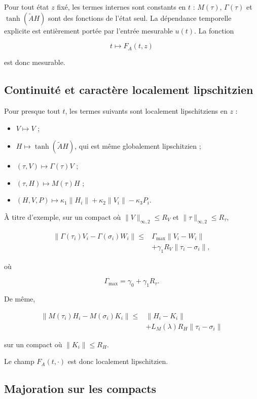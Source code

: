 Pour tout état \(z\) fixé, les termes internes sont constants en
\(t\) : \(M(\tau)\), \(\Gamma(\tau)\) et
\(\tanh(\widetilde A H)\) sont des fonctions de l'état seul. La
dépendance temporelle explicite est entièrement portée par l'entrée
mesurable \(u(t)\). La fonction

\[
t\longmapsto F_A(t,z)
\]

est donc mesurable.

\subsection{Continuité et caractère localement lipschitzien}
\label{annexe-existence-lipschitz}

Pour presque tout \(t\), les termes suivants sont localement
lipschitziens en \(z\) :

\begin{itemize}
\item
  \(V\mapsto V\) ;
\item
  \(H\mapsto\tanh(\widetilde A H)\), qui est même globalement
  lipschitzien ;
\item
  \((\tau,V)\mapsto\Gamma(\tau)V\) ;
\item
  \((\tau,H)\mapsto M(\tau)H\) ;
\item
  \((H,V,P)\mapsto
  \kappa_1\|H_i\|+\kappa_2\|V_i\|-\kappa_3P_i\).
\end{itemize}

À titre d'exemple, sur un compact où
\(\|V\|_{\infty,2}\leq R_V\) et
\(\|\tau\|_{\infty,2}\leq R_\tau\),

\[
\begin{aligned}
\|\Gamma(\tau_i)V_i-\Gamma(\sigma_i)W_i\|
\leq{}&
\Gamma_{\max}\|V_i-W_i\|
\\
&+
\gamma_1R_V\|\tau_i-\sigma_i\|,
\end{aligned}
\]

où

\[
\Gamma_{\max}
=
\gamma_0+\gamma_1R_\tau.
\]

De même,

\[
\begin{aligned}
\|M(\tau_i)H_i-M(\sigma_i)K_i\|
\leq{}&
\|H_i-K_i\|
\\
&+
L_M(\lambda)R_H\|\tau_i-\sigma_i\|
\end{aligned}
\]

sur un compact où \(\|K_i\|\leq R_H\).

Le champ \(F_A(t,\cdot)\) est donc localement lipschitzien.

\subsection{Majoration sur les compacts}
\label{annexe-existence-majoration-compacte}

